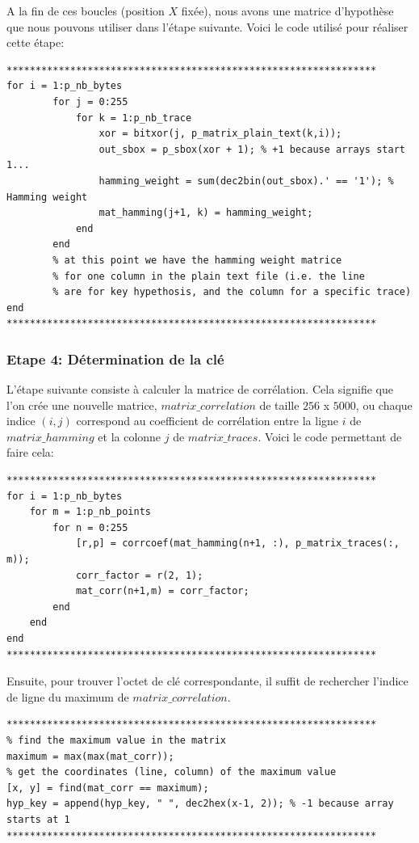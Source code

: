 \documentclass[a4paper, 12pt]{article}
\begin{document}
A la fin de ces boucles (position $X$ fixée), nous avons une matrice d'hypothèse que nous pouvons utiliser dans l'étape suivante. 
Voici le code utilisé pour réaliser cette étape:
\begin{lstlisting}
****************************************************************
for i = 1:p_nb_bytes
        for j = 0:255
            for k = 1:p_nb_trace 
                xor = bitxor(j, p_matrix_plain_text(k,i));
                out_sbox = p_sbox(xor + 1); % +1 because arrays start 1...
                hamming_weight = sum(dec2bin(out_sbox).' == '1'); % Hamming weight
                mat_hamming(j+1, k) = hamming_weight;
            end
        end 
        % at this point we have the hamming weight matrice 
        % for one column in the plain text file (i.e. the line 
        % are for key hypethosis, and the column for a specific trace)
end
****************************************************************
\end{lstlisting}

			\subsubsection{Etape 4: Détermination de la clé}
		L'étape suivante consiste à calculer la matrice de corrélation. Cela signifie que l'on crée une nouvelle matrice, $matrix\_correlation$ de taille $256$ x $5000$, ou chaque indice $(i, j)$ correspond au coefficient de corrélation entre la ligne $i$ de $matrix\_hamming$ et la colonne $j$ de $matrix\_traces$.
Voici le code permettant de faire cela:
\begin{lstlisting}
****************************************************************
for i = 1:p_nb_bytes
	for m = 1:p_nb_points
    	for n = 0:255
        	[r,p] = corrcoef(mat_hamming(n+1, :), p_matrix_traces(:, m));
            corr_factor = r(2, 1);
            mat_corr(n+1,m) = corr_factor;
        end
    end
end
****************************************************************
\end{lstlisting}


Ensuite, pour trouver l'octet de clé correspondante, il suffit de rechercher l'indice de ligne du maximum de $matrix\_correlation$. 
\begin{lstlisting}
****************************************************************
% find the maximum value in the matrix
maximum = max(max(mat_corr)); 
% get the coordinates (line, column) of the maximum value
[x, y] = find(mat_corr == maximum); 
hyp_key = append(hyp_key, " ", dec2hex(x-1, 2)); % -1 because array starts at 1
****************************************************************
\end{lstlisting}
\end{document}
